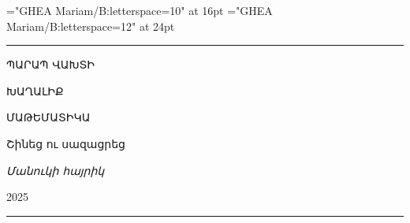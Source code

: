 
\font\hytitle="GHEA Mariam/B:letterspace=10" at 16pt
\font\hytitlebig="GHEA Mariam/B:letterspace=12" at 24pt

\hrule

\bigskip

\centerline{{\hytitle ՊԱՐԱՊ ՎԱԽՏԻ}}
\bigskip
\centerline{{\hytitlebig ԽԱՂԱԼԻՔ}}

\vskip1cm

\centerline{ՄԱԹԵՄԱՏԻԿԱ}

\vskip2cm

\centerline{Շինեց ու սազացրեց}
\centerline{{\it Մանուկի հայրիկ}}

\vskip4cm
\centerline{2025}
\medskip
\hrule


\bye
